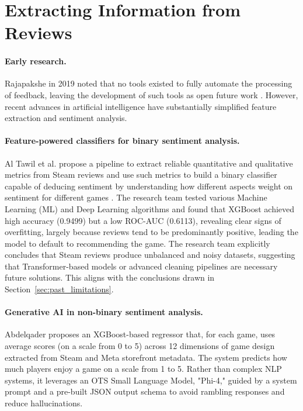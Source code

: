 \section{Extracting Information from Reviews}
\label{sec:nlp}

\paragraph{Early research.} Rajapakshe in 2019 noted that no tools existed to fully automate the processing of feedback, leaving the development of such tools as open future work \cite{feedback_analysis_game_dev}. However, recent advances in artificial intelligence have substantially simplified feature extraction and sentiment analysis.

\paragraph{Feature-powered classifiers for binary sentiment analysis.} Al Tawil et al. propose a pipeline to extract reliable quantitative and qualitative metrics from Steam reviews and use such metrics to build a binary classifier capable of deducing sentiment by understanding how different aspects weight on sentiment for different games \cite{ML_feature_extraction_al_tawil_et_al}. The research team tested various Machine Learning (ML) and Deep Learning algorithms and found that XGBoost achieved high accuracy (0.9499) but a low ROC-AUC (0.6113), revealing clear signs of overfitting, largely because reviews tend to be predominantly positive, leading the model to default to recommending the game. The research team explicitly concludes that Steam reviews produce unbalanced and noisy datasets, suggesting that Transformer-based models or advanced cleaning pipelines are necessary future solutions. This aligns with the conclusions drawn in Section~\ref{sec:past_limitations}.

\paragraph{Generative AI in non-binary sentiment analysis.} Abdelqader proposes an XGBoost-based regressor \cite{abdelqader_2025_using_generative_ai_enjoyment} that, for each game, uses average scores (on a scale from 0 to 5) across 12 dimensions of game design extracted from Steam and Meta storefront metadata. The system predicts how much players enjoy a game on a scale from 1 to 5. Rather than complex NLP systems, it leverages an OTS Small Language Model, "Phi-4," guided by a system prompt and a pre-built JSON output schema to avoid rambling responses and reduce hallucinations.

